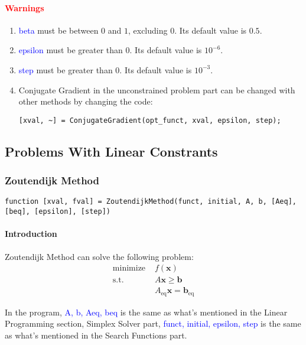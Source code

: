 \documentclass{article}
\begin{document}
\paragraph{\textcolor{red}{Warnings}}
\begin{enumerate}
    \item \textcolor{blue}{beta} must be between $0$ and $1$, excluding $0$. Its default value is $0.5$.
    \item \textcolor{blue}{epsilon} must be greater than $0$. Its default value is $10^{-6}$.
    \item \textcolor{blue}{step} must be greater than $0$. Its default value is $10^{-3}$.
    \item Conjugate Gradient in the unconstrained problem part can be changed with other methods by changing the code:
    \begin{verbatim}
[xval, ~] = ConjugateGradient(opt_funct, xval, epsilon, step);   
    \end{verbatim}
\end{enumerate}

\subsection{Problems With Linear Constrants}
\subsubsection{Zoutendijk Method}
\begin{verbatim}
function [xval, fval] = ZoutendijkMethod(funct, initial, A, b, [Aeq], [beq], [epsilon], [step])
\end{verbatim}

\paragraph{Introduction}
Zoutendijk Method can solve the following problem:
\begin{align*}
    \mbox{minimize } & f(\mathbf{x}) \\
    \mbox{s.t. } & A\mathbf{x} \geqslant \mathbf{b} \\
                 & A_{\mbox{eq}} \mathbf{x} = \mathbf{b}_{\mbox{eq}}
\end{align*}

In the program, \textcolor{blue}{A, b, Aeq, beq} is the same as what's mentioned in the Linear Programming section, Simplex Solver part, \textcolor{blue}{funct, initial, epsilon, step} is the same as what's mentioned in the Search Functions part.
\end{document}
